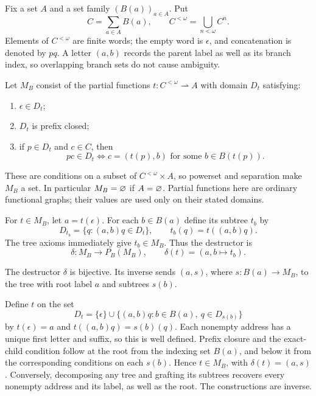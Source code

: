 Fix a set $A$ and a set family $(B(a))_{a\in A}$. Put
\[
C=\sum_{a\in A}B(a),\qquad
C^{<\omega}=\bigcup_{n<\omega} C^n.
\]
Elements of $C^{<\omega}$ are finite words; the empty word is $\epsilon$,
and concatenation is denoted by $pq$. A letter $(a,b)$ records the
parent label as well as its branch index, so overlapping branch sets do
not cause ambiguity.

\begin{definition}
Let $M_B$ consist of the partial functions $t:C^{<\omega}\rightharpoonup A$
with domain $D_t$ satisfying:
\begin{enumerate}
\item $\epsilon\in D_t$;
\item $D_t$ is prefix closed;
\item if $p\in D_t$ and $c\in C$, then
\[
pc\in D_t\iff c=(t(p),b)\text{ for some }b\in B(t(p)).
\]
\end{enumerate}
These are conditions on a subset of $C^{<\omega}\times A$, so powerset
and separation make $M_B$ a set. In particular $M_B=\varnothing$ if
$A=\varnothing$. Partial functions here are ordinary functional graphs;
their values are used only on their stated domains.
\end{definition}

For $t\in M_B$, let $a=t(\epsilon)$. For each $b\in B(a)$ define its
subtree $t_b$ by
\[
D_{t_b}=\{q:(a,b)q\in D_t\},\qquad t_b(q)=t((a,b)q).
\]
The tree axioms immediately give $t_b\in M_B$. Thus the destructor is
\[
\delta:M_B\longrightarrow P_B(M_B),\qquad
\delta(t)=(a,b\mapsto t_b).
\]

\begin{lemma}
The destructor $\delta$ is bijective. Its inverse sends $(a,s)$, where
$s:B(a)\to M_B$, to the tree with root label $a$ and subtrees $s(b)$.
\end{lemma}
\Proof
Define $t$ on the set
\[
D_t=\{\epsilon\}\cup
\{(a,b)q:b\in B(a),\ q\in D_{s(b)}\}
\]
by $t(\epsilon)=a$ and $t((a,b)q)=s(b)(q)$.
Each nonempty address has a unique first letter and suffix, so this
is well defined. Prefix closure and the exact-child condition follow
at the root from the indexing set $B(a)$, and below it from the
corresponding conditions on each $s(b)$. Hence $t\in M_B$, with
$\delta(t)=(a,s)$. Conversely, decomposing any tree and grafting its
subtrees recovers every nonempty address and its label, as well as the
root. The constructions are inverse.
\Done

